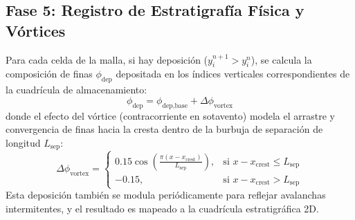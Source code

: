 \documentclass[11pt,a4paper]{article}
\begin{document}
\subsection{Fase 5: Registro de Estratigrafía Física y Vórtices}
Para cada celda de la malla, si hay deposición ($y_i^{n+1} > y_i^n$), se calcula la composición de finas $\phi_{\text{dep}}$ depositada en los índices verticales correspondientes de la cuadrícula de almacenamiento:
\begin{equation}
    \phi_{\text{dep}} = \phi_{\text{dep,base}} + \Delta\phi_{\text{vortex}}
\end{equation}
donde el efecto del vórtice (contracorriente en sotavento) modela el arrastre y convergencia de finas hacia la cresta dentro de la burbuja de separación de longitud $L_{\text{sep}}$:
\begin{equation}
\Delta\phi_{\text{vortex}} = \begin{cases}
0.15 \cos\left(\frac{\pi (x - x_{\text{crest}})}{L_{\text{sep}}}\right), & \text{si } x - x_{\text{crest}} \le L_{\text{sep}} \\
-0.15, & \text{si } x - x_{\text{crest}} > L_{\text{sep}}
\end{cases}
\end{equation}
Esta deposición también se modula periódicamente para reflejar avalanchas intermitentes, y el resultado es mapeado a la cuadrícula estratigráfica 2D.
\end{document}
